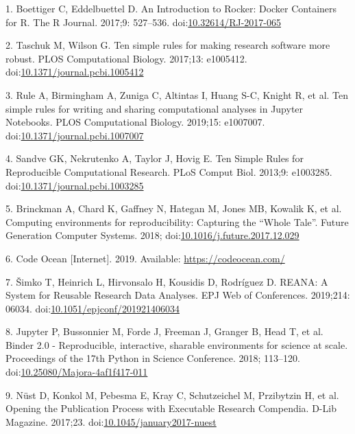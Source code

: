 \documentclass[10pt,letterpaper]{article}
\begin{document}
\hypertarget{refs}{}
\leavevmode\hypertarget{ref-boettiger_introduction_2017}{}%
1. Boettiger C, Eddelbuettel D. An Introduction to Rocker: Docker
Containers for R. The R Journal. 2017;9: 527--536.
doi:\href{https://doi.org/10.32614/RJ-2017-065}{10.32614/RJ-2017-065}

\leavevmode\hypertarget{ref-taschuk_ten_2017}{}%
2. Taschuk M, Wilson G. Ten simple rules for making research software
more robust. PLOS Computational Biology. 2017;13: e1005412.
doi:\href{https://doi.org/10.1371/journal.pcbi.1005412}{10.1371/journal.pcbi.1005412}

\leavevmode\hypertarget{ref-rule_ten_2019}{}%
3. Rule A, Birmingham A, Zuniga C, Altintas I, Huang S-C, Knight R, et
al. Ten simple rules for writing and sharing computational analyses in
Jupyter Notebooks. PLOS Computational Biology. 2019;15: e1007007.
doi:\href{https://doi.org/10.1371/journal.pcbi.1007007}{10.1371/journal.pcbi.1007007}

\leavevmode\hypertarget{ref-sandve_ten_2013}{}%
4. Sandve GK, Nekrutenko A, Taylor J, Hovig E. Ten Simple Rules for
Reproducible Computational Research. PLoS Comput Biol. 2013;9: e1003285.
doi:\href{https://doi.org/10.1371/journal.pcbi.1003285}{10.1371/journal.pcbi.1003285}

\leavevmode\hypertarget{ref-brinckman_computing_2018}{}%
5. Brinckman A, Chard K, Gaffney N, Hategan M, Jones MB, Kowalik K, et
al. Computing environments for reproducibility: Capturing the ``Whole
Tale''. Future Generation Computer Systems. 2018;
doi:\href{https://doi.org/10.1016/j.future.2017.12.029}{10.1016/j.future.2017.12.029}

\leavevmode\hypertarget{ref-code_ocean_2019}{}%
6. Code Ocean {[}Internet{]}. 2019. Available:
\url{https://codeocean.com/}

\leavevmode\hypertarget{ref-simko_reana_2019}{}%
7. Šimko T, Heinrich L, Hirvonsalo H, Kousidis D, Rodríguez D. REANA: A
System for Reusable Research Data Analyses. EPJ Web of Conferences.
2019;214: 06034.
doi:\href{https://doi.org/10.1051/epjconf/201921406034}{10.1051/epjconf/201921406034}

\leavevmode\hypertarget{ref-jupyter_binder_2018}{}%
8. Jupyter P, Bussonnier M, Forde J, Freeman J, Granger B, Head T, et
al. Binder 2.0 - Reproducible, interactive, sharable environments for
science at scale. Proceedings of the 17th Python in Science Conference.
2018; 113--120.
doi:\href{https://doi.org/10.25080/Majora-4af1f417-011}{10.25080/Majora-4af1f417-011}

\leavevmode\hypertarget{ref-nust_opening_2017}{}%
9. Nüst D, Konkol M, Pebesma E, Kray C, Schutzeichel M, Przibytzin H, et
al. Opening the Publication Process with Executable Research Compendia.
D-Lib Magazine. 2017;23.
doi:\href{https://doi.org/10.1045/january2017-nuest}{10.1045/january2017-nuest}
\end{document}
